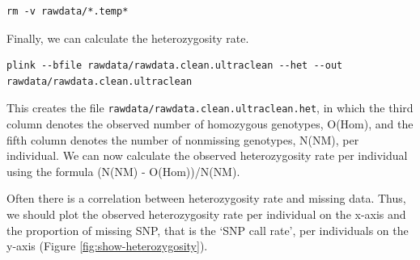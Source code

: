 \documentclass[
]{book}
\begin{document}
\begin{verbatim}
rm -v rawdata/*.temp*
\end{verbatim}

Finally, we can calculate the heterozygosity rate.

\begin{verbatim}
plink --bfile rawdata/rawdata.clean.ultraclean --het --out rawdata/rawdata.clean.ultraclean
\end{verbatim}

This creates the file \texttt{rawdata/rawdata.clean.ultraclean.het}, in which the third column denotes the observed number of homozygous genotypes, O(Hom), and the fifth column denotes the number of nonmissing genotypes, N(NM), per individual. We can now calculate the observed heterozygosity rate per individual using the formula (N(NM) - O(Hom))/N(NM).

Often there is a correlation between heterozygosity rate and missing data. Thus, we should plot the observed heterozygosity rate per individual on the x-axis and the proportion of missing SNP, that is the `SNP call rate', per individuals on the y-axis (Figure \ref{fig:show-heterozygosity}).
\end{document}
